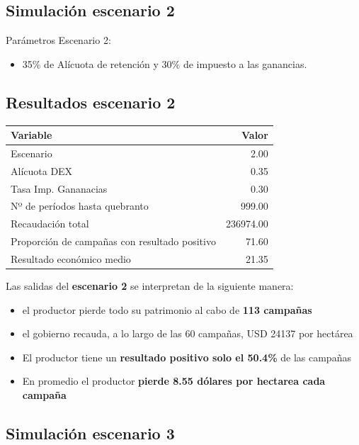 \documentclass[
  12pt,
  spanish,
  10pt]{article}
\providecommand{\tightlist}{%
  \setlength{\itemsep}{0pt}\setlength{\parskip}{0pt}}
\begin{document}
\hypertarget{simulaciuxf3n-escenario-2}{%
\subsection{Simulación escenario 2}\label{simulaciuxf3n-escenario-2}}

Parámetros Escenario 2:

\begin{itemize}
\tightlist
\item
  35\% de Alícuota de retención y 30\% de impuesto a las ganancias.
\end{itemize}

\hypertarget{resultados-escenario-2}{%
\subsection{Resultados escenario 2}\label{resultados-escenario-2}}

\begin{longtable}[]{@{}lr@{}}
\toprule
Variable & Valor\tabularnewline
\midrule
\endhead
Escenario & 2.00\tabularnewline
Alícuota DEX & 0.35\tabularnewline
Tasa Imp. Gananacias & 0.30\tabularnewline
Nº de períodos hasta quebranto & 999.00\tabularnewline
Recaudación total & 236974.00\tabularnewline
Proporción de campañas con resultado positivo & 71.60\tabularnewline
Resultado económico medio & 21.35\tabularnewline
\bottomrule
\end{longtable}

Las salidas del \textbf{escenario 2} se interpretan de la siguiente
manera:

\begin{itemize}
\tightlist
\item
  el productor pierde todo su patrimonio al cabo de \textbf{113
  campañas}
\item
  el gobierno recauda, a lo largo de las 60 campañas, USD 24137 por
  hectárea
\item
  El productor tiene un \textbf{resultado positivo solo el 50.4\%} de
  las campañas
\item
  En promedio el productor \textbf{pierde 8.55 dólares por hectarea cada
  campaña}
\end{itemize}

\hypertarget{simulaciuxf3n-escenario-3}{%
\subsection{Simulación escenario 3}\label{simulaciuxf3n-escenario-3}}
\end{document}
